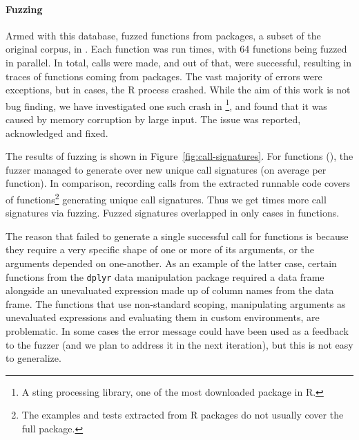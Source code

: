 \documentclass[sigplan,anonymous,review]{acmart}
\begin{document}
\paragraph{Fuzzing}

Armed with this database, \tool fuzzed \UFNumFunctions functions from \UFNumPackages packages, a subset of the original corpus, in \UFTracingTime.
Each function was run \UFTracingBudget times, with 64 functions being fuzzed in parallel.
In total, \UFNumTracesRnd calls were made, and out of that, \UFRatioSucesssTraces were successful, resulting in \UFNumSuccessTraces traces of \UFNumSuccessFunctions functions coming from \UFNumSuccessPackages packages.
The vast majority of errors were exceptions, but in \UFNumCrashedRSessions cases, the R process crashed.
While the aim of this work is not bug finding, we have investigated one such crash in \footnote{A sting processing library, one of the most downloaded package in R.}, and found that it was caused by memory corruption by large input.
The issue was reported, acknowledged and fixed.

The results of fuzzing is shown in Figure~\ref{fig:call-signatures}.
For \UFNumFunctionsSignatrSignatrue functions (\UFNumFunctionsSignatrToCorpusSignatureRatio), the fuzzer managed to generate over \UFSignatrSignaturesRnd new unique call signatures (on average \UFAvgNewSignatrSignature per function).
In comparison, recording calls from the extracted runnable code covers \UFNumFunctionsBaselineToCorpusSignatureRatio of functions\footnote{The examples and tests extracted from R packages do not usually cover the full package.} generating \UFOnlyBaselineSignatures unique call signatures.
Thus we get \UFSignatrBaselineSignaturesRatio times more call signatures via fuzzing.
Fuzzed signatures overlapped in only \UFSharedSignatures cases in \UFSharedSignatuesFunctions functions.

The reason that \tool failed to generate a single successful call for \UFNumMissingFunctionSignatr functions is because they require a very specific shape of one or more of its arguments, or the arguments depended on one-another.
As an example of the latter case, certain functions from the {\tt dplyr} data manipulation package required a data frame alongside an unevaluated expression made up of column names from the data frame. 
The functions that use non-standard scoping, manipulating arguments as unevaluated expressions and evaluating them in custom environments, are problematic.
In some cases the error message could have been used as a feedback to the fuzzer (and we plan to address it in the next iteration), but this is not easy to generalize.
\end{document}
